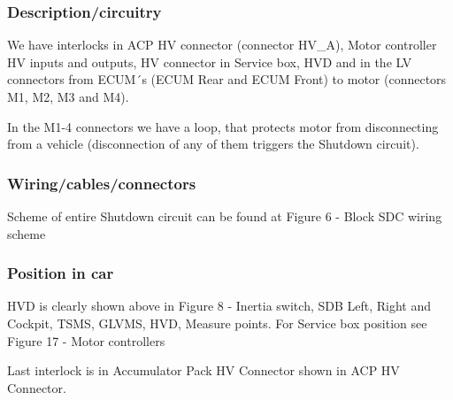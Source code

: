 \subsubsection{Description/circuitry}
\iffalse Describe the concept and circuitry of the Shutdown System Interlocks.
Note: Interlocks are circuits used to open the shutdown circuit if a connector is disconnected or enclosure is opened.  This is not the entire shutdown circuit.\fi

We have interlocks in ACP HV connector (connector HV\_A), Motor controller HV inputs and outputs, HV connector in Service box, HVD and in the LV connectors from ECUM´s (ECUM Rear and ECUM Front) to motor (connectors M1, M2, M3 and M4). 


In the M1-4 connectors we have a loop, that protects motor from disconnecting from a vehicle (disconnection of any of them triggers the Shutdown circuit).

\subsubsection{Wiring/cables/connectors}

Scheme of entire Shutdown circuit can be found at Figure 6 - Block SDC wiring scheme
\subsubsection{Position in car}
HVD is clearly shown above in Figure 8 - Inertia switch, SDB Left, Right and Cockpit, TSMS, GLVMS, HVD, Measure points. For Service box position see Figure 17 - Motor controllers

Last interlock is in Accumulator Pack HV Connector shown in ACP HV Connector.